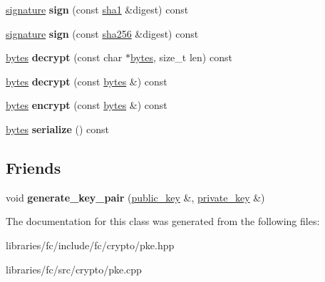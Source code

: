 \begin{DoxyCompactItemize}
\item 
\mbox{\label{classfc_1_1private__key_a7bbd7a1629fa75b0b34ebb8200edf0b3}} 
\mbox{\hyperlink{classstd_1_1vector}{signature}} {\bfseries sign} (const \mbox{\hyperlink{classfc_1_1sha1}{sha1}} \&digest) const
\item 
\mbox{\label{classfc_1_1private__key_afb1ea01c2e5c0aa49e77560990587beb}} 
\mbox{\hyperlink{classstd_1_1vector}{signature}} {\bfseries sign} (const \mbox{\hyperlink{classfc_1_1sha256}{sha256}} \&digest) const
\item 
\mbox{\label{classfc_1_1private__key_ada59c770d72d17e7b4883ab89579ee19}} 
\mbox{\hyperlink{classstd_1_1vector}{bytes}} {\bfseries decrypt} (const char $\ast$\mbox{\hyperlink{classstd_1_1vector}{bytes}}, size\+\_\+t len) const
\item 
\mbox{\label{classfc_1_1private__key_a059a5103607735c220dbf05c260d9853}} 
\mbox{\hyperlink{classstd_1_1vector}{bytes}} {\bfseries decrypt} (const \mbox{\hyperlink{classstd_1_1vector}{bytes}} \&) const
\item 
\mbox{\label{classfc_1_1private__key_a6cf05d185a0b760ed850aa4b691efa25}} 
\mbox{\hyperlink{classstd_1_1vector}{bytes}} {\bfseries encrypt} (const \mbox{\hyperlink{classstd_1_1vector}{bytes}} \&) const
\item 
\mbox{\label{classfc_1_1private__key_af58c4fd2b237e43ff6a28c70bb082ee7}} 
\mbox{\hyperlink{classstd_1_1vector}{bytes}} {\bfseries serialize} () const
\end{DoxyCompactItemize}
\subsection*{Friends}
\begin{DoxyCompactItemize}
\item 
\mbox{\label{classfc_1_1private__key_a4565b23872cef7fbf06ebd2749c89348}} 
void {\bfseries generate\+\_\+key\+\_\+pair} (\mbox{\hyperlink{classfc_1_1public__key}{public\+\_\+key}} \&, \mbox{\hyperlink{classfc_1_1private__key}{private\+\_\+key}} \&)
\end{DoxyCompactItemize}


The documentation for this class was generated from the following files\+:\begin{DoxyCompactItemize}
\item 
libraries/fc/include/fc/crypto/pke.\+hpp\item 
libraries/fc/src/crypto/pke.\+cpp\end{DoxyCompactItemize}
